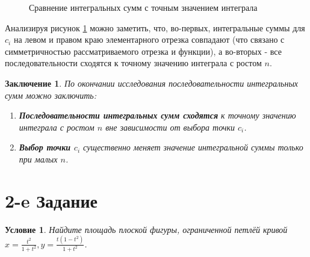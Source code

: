 \documentclass[12pt, a4paper]{article}
\newtheorem*{task}{Условие}
\newtheorem*{finish}{Заключение}
\begin{document}
\newcommand{\sumPoint}[2]{
\draw [dotted, \scolor,  thick] (#2, #1) node[rectangle, fill, inner sep=1.5pt]{};
•}


\begin{figure}[H]

\caption{Сравнение интегральных сумм с точным значением интеграла}
\label{gr:integral}
\end{figure}
Анализируя рисунок \ref{gr:integral} можно заметить, что, во-первых, интегральные суммы для $c_i$ на левом и правом краю элементарного отрезка совпадают (что связано с симметричностью рассматриваемого отрезка и функции), а во-вторых - все последовательности сходятся к точному значению интеграла с ростом $n$.
\begin{finish}
По окончании исследования последовательности интегральных сумм можно заключить:
\begin{enumerate}
\item \textbf{Последовательности интегральных сумм сходятся} к точному значению интеграла с ростом $n$ вне зависимости от выбора точки $c_i$.
\item \textbf{Выбор точки $c_i$} существенно меняет значение интегральной суммы только при малых $n$. 
\end{enumerate}
\end{finish}
\section{2-e Задание}
\begin{task}
Найдите площадь плоской фигуры, ограниченной петлёй кривой $x= \frac{t^2}{1+t^2}, y=\frac{t(1-t^2)}{1+t^2}$.
\end{task}
\end{document}
